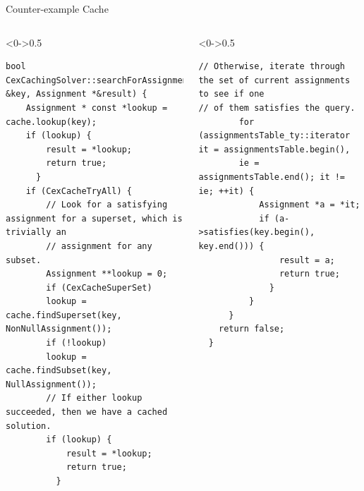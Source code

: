 \documentclass[9pt,aspectratio=43,mathserif,table]{beamer}
\begin{document}
\begin{frame}[fragile]{Counter-example Cache}
	\begin{columns}[T]
		\begin{column}<0->{0.5\textwidth}
			\begin{lstlisting}[numbersep=4pt]
bool CexCachingSolver::searchForAssignment(KeyType &key, Assignment *&result) {
    Assignment * const *lookup = cache.lookup(key);
    if (lookup) {
        result = *lookup;
        return true;
      }
    if (CexCacheTryAll) {
        // Look for a satisfying assignment for a superset, which is trivially an
        // assignment for any subset.
        Assignment **lookup = 0;
        if (CexCacheSuperSet)
        lookup = cache.findSuperset(key, NonNullAssignment());
        if (!lookup)
        lookup = cache.findSubset(key, NullAssignment());
        // If either lookup succeeded, then we have a cached solution.
        if (lookup) {
            result = *lookup;
            return true;
          }
          \end{lstlisting}
		\end{column}
		\hfill
		\begin{column}<0->{0.5\textwidth}
			\begin{lstlisting}[firstnumber=last,numbersep=4pt]
// Otherwise, iterate through the set of current assignments to see if one
// of them satisfies the query.
        for (assignmentsTable_ty::iterator it = assignmentsTable.begin(),
        ie = assignmentsTable.end(); it != ie; ++it) {
            Assignment *a = *it;
            if (a->satisfies(key.begin(), key.end())) {
                result = a;
                return true;
              }
          }
      } 
    return false;
  }
      \end{lstlisting}
		\end{column}
	\end{columns}
\end{frame}
\end{document}
